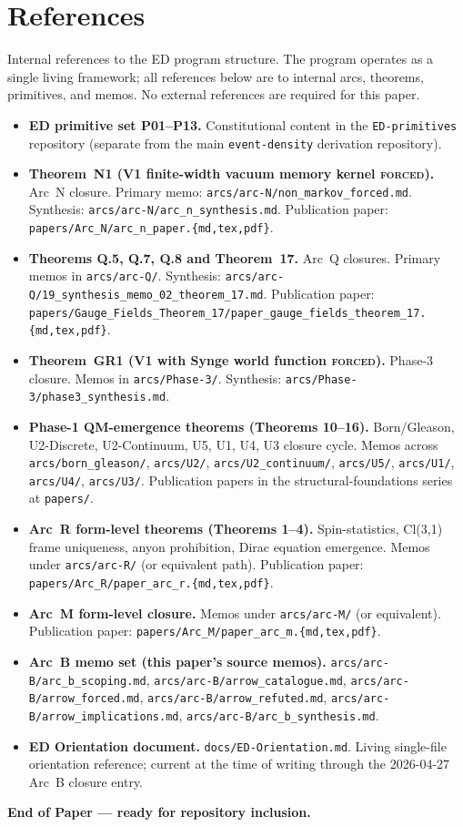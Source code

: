 \documentclass[11pt,a4paper]{article}
\begin{document}
\section*{References}

Internal references to the ED program structure. The program operates as a single living framework; all references below are to internal arcs, theorems, primitives, and memos. No external references are required for this paper.

\begin{itemize}[leftmargin=1.5em]
  \item \textbf{ED primitive set P01--P13.} Constitutional content in the \texttt{ED-primitives} repository (separate from the main \texttt{event-density} derivation repository).
  \item \textbf{Theorem~N1 (V1 finite-width vacuum memory kernel \textsc{forced}).} Arc~N closure. Primary memo: \texttt{arcs/arc-N/non\_markov\_forced.md}. Synthesis: \texttt{arcs/arc-N/arc\_n\_synthesis.md}. Publication paper: \texttt{papers/Arc\_N/arc\_n\_paper.\{md,tex,pdf\}}.
  \item \textbf{Theorems Q.5, Q.7, Q.8 and Theorem~17.} Arc~Q closures. Primary memos in \texttt{arcs/arc-Q/}. Synthesis: \texttt{arcs/arc-Q/19\_synthesis\_memo\_02\_theorem\_17.md}. Publication paper: \texttt{papers/Gauge\_Fields\_Theorem\_17/paper\_gauge\_fields\_theorem\_17.\{md,tex,pdf\}}.
  \item \textbf{Theorem~GR1 (V1 with Synge world function \textsc{forced}).} Phase-3 closure. Memos in \texttt{arcs/Phase-3/}. Synthesis: \texttt{arcs/Phase-3/phase3\_synthesis.md}.
  \item \textbf{Phase-1 QM-emergence theorems (Theorems 10--16).} Born/Gleason, U2-Discrete, U2-Continuum, U5, U1, U4, U3 closure cycle. Memos across \texttt{arcs/born\_gleason/}, \texttt{arcs/U2/}, \texttt{arcs/U2\_continuum/}, \texttt{arcs/U5/}, \texttt{arcs/U1/}, \texttt{arcs/U4/}, \texttt{arcs/U3/}. Publication papers in the structural-foundations series at \texttt{papers/}.
  \item \textbf{Arc~R form-level theorems (Theorems 1--4).} Spin-statistics, Cl(3,1) frame uniqueness, anyon prohibition, Dirac equation emergence. Memos under \texttt{arcs/arc-R/} (or equivalent path). Publication paper: \texttt{papers/Arc\_R/paper\_arc\_r.\{md,tex,pdf\}}.
  \item \textbf{Arc~M form-level closure.} Memos under \texttt{arcs/arc-M/} (or equivalent). Publication paper: \texttt{papers/Arc\_M/paper\_arc\_m.\{md,tex,pdf\}}.
  \item \textbf{Arc~B memo set (this paper's source memos).} \texttt{arcs/arc-B/arc\_b\_scoping.md}, \texttt{arcs/arc-B/arrow\_catalogue.md}, \texttt{arcs/arc-B/arrow\_forced.md}, \texttt{arcs/arc-B/arrow\_refuted.md}, \texttt{arcs/arc-B/arrow\_implications.md}, \texttt{arcs/arc-B/arc\_b\_synthesis.md}.
  \item \textbf{ED Orientation document.} \texttt{docs/ED-Orientation.md}. Living single-file orientation reference; current at the time of writing through the 2026-04-27 Arc~B closure entry.
\end{itemize}

\bigskip

\noindent \textbf{End of Paper --- ready for repository inclusion.}
\end{document}
